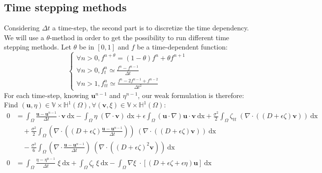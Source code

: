 \documentclass[11pt,a4paper]{article}
\begin{document}
\subsection{Time stepping methods}	
	Considering $\Delta t$ a time-step, the second part is to discretize the time dependency. We will use a $\theta$-method in order to get the possibility to run different time stepping methods. Let $\theta$ be in $[0,1] $ and $f$ be a time-dependent function: 	
	\begin{equation}
		\left\lbrace
			\begin{array}{l}
				\displaystyle \forall n > 0, f^{n+\theta} = (1-\theta)f^{n} + \theta f^{n+1}\\
				\displaystyle \forall n > 0, f_t^n \simeq \frac{f^n - f^{n-1}}{\Delta t} \\
				\displaystyle \forall n > 1, f_{tt}^n \simeq \frac{f^n -2f^{n-1} + f^{n-2}}{\Delta t^2} 
			\end{array}
		\right.
	\end{equation}
	For each time-step, knowing $\mathbf{u}^{n-1}$ and $\eta^{n-1}$, our weak formulation is therefore: Find $(\mathbf{u},\eta) \in \mathbb{V} \times \mathbb{H}^1(\Omega), \forall (\mathbf{v},\xi) \in \mathbb{V} \times \mathbb{H}^1(\Omega)$: 
	\begin{equation}
		\begin{split}
			0 &= \int_{\Omega} \! \frac{\mathbf{u} - \mathbf{u}^{n-1}}{\Delta t} \cdot \mathbf{v} \: \mathrm{dx} - \int_{\Omega} \! \eta \; (\nabla \cdot \mathbf{v}) \: \mathrm{dx} + \epsilon \! \int_{\Omega} \! (\mathbf{u} \cdot \nabla ) \mathbf{u} \cdot \mathbf{v} \: \mathrm{dx} + \frac{\sigma^2}{2} \! \int_{\Omega} \! \zeta_{tt}  \; (\nabla \cdot( (D + \epsilon \zeta) \mathbf{v})) \: \mathrm{dx} \\ 
			&\quad + \frac{\sigma^2}{2} \! \int_{\Omega} \!  (\nabla \cdot ((D + \epsilon \zeta) \frac{\mathbf{u} - \mathbf{u}^{n-1}}{\Delta t})) \; (\nabla \cdot ((D + \epsilon \zeta) \mathbf{v}) )\: \mathrm{dx} \\
			& \quad- \frac{\sigma^2}{6} \! \int_{\Omega} \! (\nabla \cdot \frac{\mathbf{u} - \mathbf{u}^{n-1}}{\Delta t}) \; (\nabla  \cdot ((D + \epsilon \zeta)^2  \mathbf{v})) \: \mathrm{dx} \\
			\displaystyle 0 &= \int_{\Omega}\! \frac{\eta - \eta^{n-1}}{\Delta t} \; \xi \: \mathrm{dx} + \int_{\Omega}\! \zeta_t \; \xi \: \mathrm{dx} -\int_{\Omega}\! \nabla \xi \; \cdot [(D + \epsilon \zeta+\epsilon\eta) \mathbf{u}]  \: \mathrm{dx}
		\end{split}
	\end{equation}
	
\end{document}
